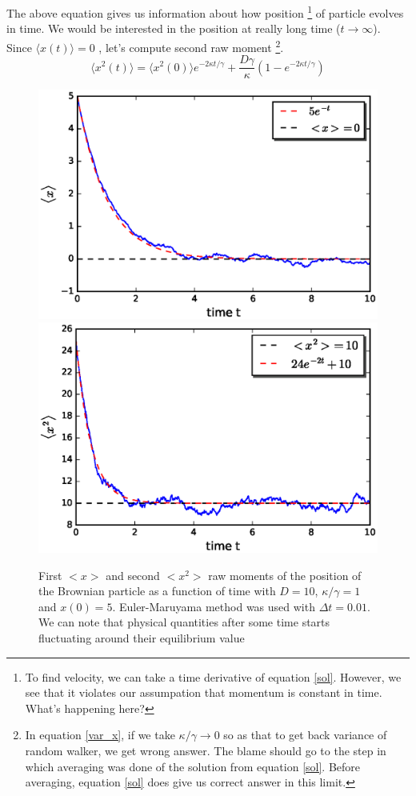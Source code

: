 \documentclass[11pt,a4paper]{article}
\begin{document}
The above equation gives us information about how position \footnote{To find velocity, we can take a time derivative of equation \ref{sol}. However, we see that it violates our assumpation that momentum is constant in time. What's happening here?} of particle evolves in time.
We would be interested in the position at really long time ($t\rightarrow \infty$). Since $\langle x (t) \rangle=0$ , let's compute second raw moment \footnote{In equation \ref{var_x}, if we take $\kappa /\gamma \rightarrow 0$ so as that to get back variance of random walker, we get wrong answer. The blame should go to the step in which averaging was done of the solution from equation \ref{sol}. Before averaging, equation \ref{sol} does give us correct answer in this limit. }.
\begin{equation}
\langle x^2 (t) \rangle = \langle x^2 (0) \rangle e^{-2\kappa t/\gamma} + \dfrac{D \gamma}{\kappa}(1-e^{-2\kappa t/\gamma})
\label{var_x}
\end{equation}

\begin{figure}[!htbp]
\centering
\includegraphics[scale=0.5]{x_brown_mean.eps}
\includegraphics[scale=0.5]{x2_brown.eps}
\caption{ First $<x>$ and second $<x^2>$  raw moments of the position of the Brownian particle as a function of time with $D=10$, $\kappa/\gamma=1$ and $x(0)=5$. Euler-Maruyama method was used with $\Delta t=0.01$. We can note that physical quantities after some time starts fluctuating around their equilibrium value}
\label{varx_brown}
\end{figure}
\end{document}

